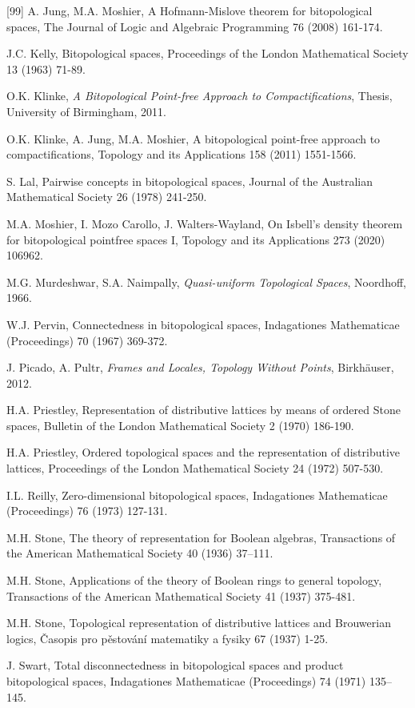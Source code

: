 \documentclass[11pt]{article}
\theoremstyle{plain}
\theoremstyle{definition}
\begin{document}
\begin{thebibliography}{[99]}
 A. Jung, M.A.  Moshier,  A Hofmann-Mislove theorem for bitopological spaces, The Journal of Logic and Algebraic Programming 76 (2008) 161-174. 
 
 J.C. Kelly,   Bitopological spaces, Proceedings of the London Mathematical Society 13 (1963) 71-89.

 O.K. Klinke, \emph{A Bitopological Point-free Approach to Compactifications}, Thesis,   University of Birmingham, 2011.

 O.K. Klinke, A. Jung, M.A.  Moshier, A bitopological point-free approach to compactifications, Topology and its Applications 158 (2011) 1551-1566.

 S. Lal,  Pairwise concepts in bitopological spaces, Journal of the Australian Mathematical Society   26 (1978)  241-250.
 
 M.A. Moshier, I. Mozo Carollo, J. Walters-Wayland,   On Isbell's density theorem for bitopological
pointfree spaces I, Topology and its Applications 273 (2020) 106962.

M.G. Murdeshwar, S.A. Naimpally, \emph{Quasi-uniform Topological Spaces}, Noordhoff, 1966.

 W.J. Pervin,  Connectedness in bitopological spaces, Indagationes Mathematicae (Proceedings) 70 (1967) 369-372.

 J. Picado, A. Pultr, \emph{Frames and Locales, Topology Without Points}, Birkh\"{a}user, 2012.

 H.A. Priestley, Representation of distributive lattices by means of ordered Stone spaces, Bulletin of the London Mathematical Society 2 (1970)  186-190.

 H.A. Priestley, Ordered topological spaces and the representation of distributive lattices, Proceedings of the London Mathematical Society 24 (1972) 507-530.
 
I.L. Reilly, Zero-dimensional bitopological spaces, Indagationes Mathematicae (Proceedings) 76 (1973) 127-131.
  
 M.H. Stone, The theory of representation for Boolean algebras,  Transactions of the American Mathematical Society 40  (1936)  37–111.

 M.H. Stone, Applications of the theory of Boolean rings to general topology, Transactions of the American Mathematical Society 41 (1937) 375-481.

 M.H. Stone, Topological representation of distributive lattices and Brouwerian logics, \v{C}asopis pro p\v{e}stov\'{a}n\'{i} matematiky a fysiky 67 (1937) 1-25.
 

 J. Swart, Total disconnectedness in bitopological spaces and product bitopological spaces, 
Indagationes Mathematicae (Proceedings) 74 (1971) 135--145.

\end{thebibliography} 
\end{document}
